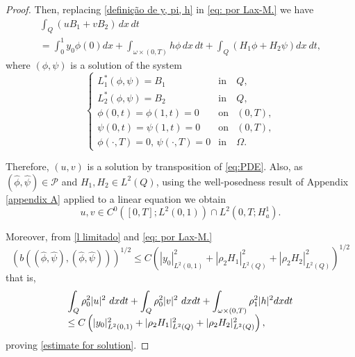 \documentclass[11pt,oneside,a4papper]{osajnl}
\begin{document}
\begin{proof}
Then, replacing \eqref{definição de y, pi, h} in \eqref{eq: por Lax-M.} we have \\
\begin{equation*}
    \begin{array}{l}
         \displaystyle\int_{Q}(u B_{1} + v B_{2})\,dx\,dt\\
         = \displaystyle\int_{0}^{1}y_{0}\phi(0)dx + \displaystyle\int_{\omega \times (0,T)} h \phi\,dx\,dt + \displaystyle\int_{Q}(H_1\phi + H_2\psi)dx\ dt,
    \end{array}
\end{equation*}
where $(\phi,\psi)$ is a solution of the system
\begin{equation*}
    \left\{\begin{array}{lll}
       L_1^{\ast} (\phi,\psi) = B_1   &\text{in}& Q,  \\
       L_2^{\ast} (\phi,\psi) = B_2   &\text{in}& Q, \\
       \phi(0,t)=\phi(1,t)=0 & \text{on} & (0,T), \\ \psi(0,t)=\psi(1,t)=0 & \text{on}& (0,T), \\
       \phi(\cdot,T)=0,\, \psi(\cdot,T)=0 &\text{in}& \Omega.
   \end{array}\right.
\end{equation*}

Therefore, $(u,v)$ is a solution by transposition of \eqref{eq:PDE}. Also, as $(\hat{\phi},\hat{\psi})\in\mathcal{P}$ and 
$H_{1}, H_{2}\in L^{2}(Q)$,  
using the well-posedness result of Appendix \ref{appendix A} applied to a linear equation we obtain
$$u,v \in C^{0}([0,T];L^{2}(0,1))\cap L^{2}(0,T;H^{1}_{a}).$$

Moreover, from \eqref{l limitado} and \eqref{eq: por Lax-M.}
\begin{equation*}
\left(b((\hat{\phi},\hat{\psi}),(\hat{\phi},\hat{\psi}))\right)^{1/2}  \leq C \left(|y_{0}|^{2}_{L^{2}(0,1)} + |\rho_{2}H_{1}|^{2}_{L^{2}(Q)}  + |\rho_{2}H_{2}|^{2}_{L^{2}(Q)}\right)^{1/2}
\end{equation*}
that is,
\begin{equation*}
\begin{array}{l}
\displaystyle\int_{Q}\rho_{0}^{2} |u|^{2}\ dxdt + \displaystyle\displaystyle\int_{Q}\rho_{0}^{2} |v|^{2}\ dxdt + \displaystyle\int_{\omega \times (0,T)}\rho_{1}^{2} |h|^{2} dx dt\\
\leq C\left(|y_{0}|^{2}_{L^{2}(0,1)} + |\rho_{2}H_{1}|^{2}_{L^{2}(Q)}  + |\rho_{2}H_{2}|^{2}_{L^{2}(Q)} \right),
\end{array}
\end{equation*}
proving \eqref{estimate for solution}.
\end{proof}
\end{document}
